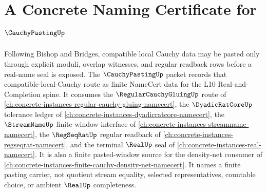 \chapter{A Concrete Naming Certificate for $\CauchyPastingUp$}
\label{ch:concrete-instances-cauchy-pasting-namecert}

Following Bishop and Bridges, compatible local Cauchy data may be pasted only through explicit moduli, overlap witnesses, and regular readback rows before a real-name seal is exposed. The $\CauchyPastingUp$ packet records that compatible-local-Cauchy route as finite NameCert data for the L10 Real-and-Completion spine. It consumes the $\RegularCauchyGluingUp$ route of \autoref{ch:concrete-instances-regular-cauchy-gluing-namecert}, the $\DyadicRatCoreUp$ tolerance ledger of \autoref{ch:concrete-instances-dyadicratcore-namecert}, the $\StreamNameUp$ finite-window interface of \autoref{ch:concrete-instances-streamname-namecert}, the $\RegSeqRatUp$ regular readback of \autoref{ch:concrete-instances-regseqrat-namecert}, and the terminal $\RealUp$ seal of \autoref{ch:concrete-instances-real-namecert}. It is also a finite pasted-window source for the density-net consumer of \autoref{ch:concrete-instances-finite-cauchy-density-net-namecert}. It names a finite pasting carrier, not quotient stream equality, selected representatives, countable choice, or ambient $\RealUp$ completeness.

